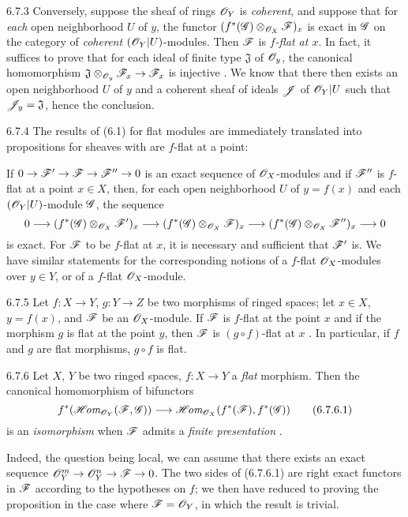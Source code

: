 \begin{env}{6.7.3}
\label{env-0.6.7.3}
Conversely, suppose the sheaf of rings $\mathscr{O}_Y$ is \emph{coherent}, and suppose that for
\emph{each} open neighborhood $U$ of $y$, the functor $(f^*(\mathscr{G})\otimes_{\mathscr{O}_X}\mathscr{F})_x$
is exact in $\mathscr{G}$ on the category of \emph{coherent} $(\mathscr{O}_Y|U)$-modules. Then $\mathscr{F}$ is
\emph{$f$-flat at $x$}. In fact, it suffices to prove that for each ideal of finite type
$\mathfrak{J}$ of $\mathscr{O}_y$, the canonical homomorphism
$\mathfrak{J}\otimes_{\mathscr{O}_y}\mathscr{F}_x\to\mathscr{F}_x$ is injective . We know
 that there then exists an open neighborhood
$U$ of $y$ and a coherent sheaf of ideals $\mathscr{J}$ of $\mathscr{O}_Y|U$ such that
$\mathscr{J}_y=\mathfrak{J}$, hence the conclusion.
\end{env}

\begin{env}{6.7.4}
\label{env-0.6.7.4}
The results of (6.1) for flat modules are immediately translated into propositions for
sheaves with are $f$-flat at a point:

If $0\to\mathscr{F}'\to\mathscr{F}\to\mathscr{F}''\to 0$ is an exact sequence of $\mathscr{O}_X$-modules and if
$\mathscr{F}''$ is $f$-flat at a point $x\in X$, then, for each open neighborhood $U$ of $y=f(x)$
and each $(\mathscr{O}_Y|U)$-module $\mathscr{G}$, the sequence
\[
  0\longrightarrow(f^*(\mathscr{G})\otimes_{\mathscr{O}_X}\mathscr{F}')_x
  \longrightarrow(f^*(\mathscr{G})\otimes_{\mathscr{O}_X}\mathscr{F})_x
  \longrightarrow(f^*(\mathscr{G})\otimes_{\mathscr{O}_X}\mathscr{F}'')_x\longrightarrow 0
\]
is exact. For $\mathscr{F}$ to be $f$-flat at $x$, it is necessary and sufficient that $\mathscr{F}'$
is. We have similar statements for the corresponding notions of a $f$-flat $\mathscr{O}_X$-modules
over $y\in Y$, or of a $f$-flat $\mathscr{O}_X$-module.
\end{env}

\begin{env}{6.7.5}
\label{env-0.6.7.5}
Let $f:X\to Y$, $g:Y\to Z$ be two morphisms of ringed spaces; let $x\in X$, $y=f(x)$, and
$\mathscr{F}$ be an $\mathscr{O}_X$-module. If $\mathscr{F}$ is $f$-flat at the point $x$ and if the morphism
$g$ is flat at the point $y$, then $\mathscr{F}$ is $(g\circ f)$-flat at $x$ . In
particular, if $f$ and $g$ are flat morphisms, $g\circ f$ is flat.
\end{env}

\begin{env}{6.7.6}
\label{env-0.6.7.6}
Let $X$, $Y$ be two ringed spaces, $f:X\to Y$ a \emph{flat} morphism. Then the canonical
homomorphism of bifunctors 
\[
  f^*(\mathscr{H}\!\textit{om}_{\mathscr{O}_Y}(\mathscr{F},\mathscr{G}))\longrightarrow\mathscr{H}\!\textit{om}_{\mathscr{O}_X}(f^*(\mathscr{F}),f^*(\mathscr{G}))
  \tag{6.7.6.1}
\]
is an \emph{isomorphism} when $\mathscr{F}$ admits a \emph{finite presentation} .

Indeed, the question being local, we can assume that there exists an exact sequence
$\mathscr{O}_Y^m\to\mathscr{O}_Y^n\to\mathscr{F}\to 0$. The two sides of (6.7.6.1) are right exact functors in
$\mathscr{F}$ according to the hypotheses on $f$; we then have reduced to proving the proposition
in the case where $\mathscr{F}=\mathscr{O}_Y$, in which the result is trivial.
\end{env}

